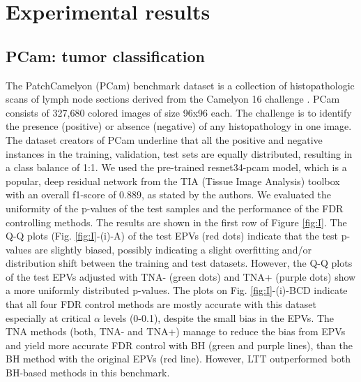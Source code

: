 \documentclass{article}
\begin{document}
\section{Experimental results}

\subsection{PCam: tumor classification}



The PatchCamelyon (PCam) benchmark dataset is a collection of histopathologic scans of lymph node sections \cite{Veeling2018-qh} derived from the Camelyon 16 challenge \cite{camelyon16}. PCam consists of 327,680 colored images of size 96x96 each. The challenge is to identify the presence (positive) or absence (negative) of any histopathology in one image. The dataset creators of PCam underline that all the positive and negative instances in the training, validation, test sets are equally distributed, resulting in a class balance of 1:1. We used the pre-trained resnet34-pcam model, which is a popular, deep residual network from the TIA (Tissue Image Analysis) toolbox \cite{Pocock2022} with an overall f1-score of 0.889, as stated by the authors. We evaluated the uniformity of the p-values of the test samples and the performance of the FDR controlling methods. The results are shown in the first row of Figure \ref{fig:I}.  The Q-Q plots (Fig. \ref{fig:I}-(i)-A) of the test EPVs (red dots) indicate that the test p-values are slightly biased, possibly indicating a slight overfitting and/or distribution shift between the training and test datasets. However, the Q-Q plots of the test  EPVs adjusted with TNA- (green dots) and TNA+ (purple dots) show a more uniformly distributed p-values. The plots on Fig. \ref{fig:I}-(i)-BCD indicate that all four FDR control methods are mostly accurate with this dataset especially at critical $\alpha$ levels (0-0.1), despite the small bias in the EPVs. The TNA methods (both, TNA- and TNA+) manage to reduce the bias from EPVs and yield more accurate FDR control with BH (green and purple lines), than the BH method with the original EPVs (red line). However, LTT outperformed both BH-based methods in this benchmark. 
\end{document}
